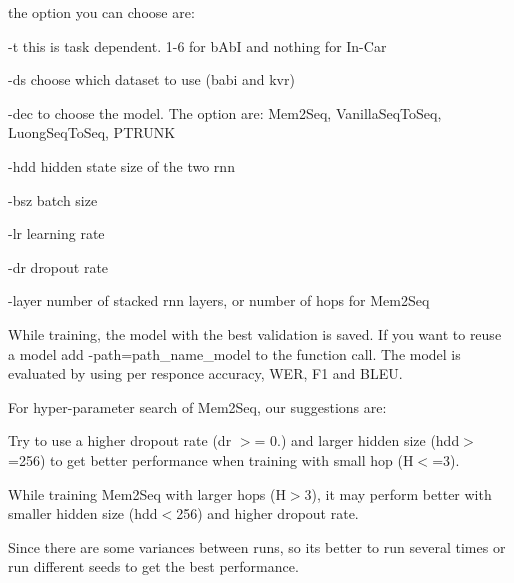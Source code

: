 the option you can choose are\+:
\begin{DoxyItemize}
\item {\ttfamily -\/t} this is task dependent. 1-\/6 for b\+AbI and nothing for In-\/\+Car
\item {\ttfamily -\/ds} choose which dataset to use (babi and kvr)
\item {\ttfamily -\/dec} to choose the model. The option are\+: Mem2\+Seq, Vanilla\+Seq\+To\+Seq, Luong\+Seq\+To\+Seq, P\+T\+R\+U\+NK
\item {\ttfamily -\/hdd} hidden state size of the two rnn
\item {\ttfamily -\/bsz} batch size
\item {\ttfamily -\/lr} learning rate
\item {\ttfamily -\/dr} dropout rate
\item {\ttfamily -\/layer} number of stacked rnn layers, or number of hops for Mem2\+Seq
\end{DoxyItemize}

While training, the model with the best validation is saved. If you want to reuse a model add {\ttfamily -\/path=path\+\_\+name\+\_\+model} to the function call. The model is evaluated by using per responce accuracy, W\+ER, F1 and B\+L\+EU.

 

For hyper-\/parameter search of Mem2\+Seq, our suggestions are\+:
\begin{DoxyItemize}
\item Try to use a higher dropout rate (dr $>$= 0.) and larger hidden size (hdd$>$=256) to get better performance when training with small hop (H$<$=3).
\item While training Mem2\+Seq with larger hops (H$>$3), it may perform better with smaller hidden size (hdd$<$256) and higher dropout rate.
\item Since there are some variances between runs, so it\textquotesingle{}s better to run several times or run different seeds to get the best performance.
\end{DoxyItemize}
